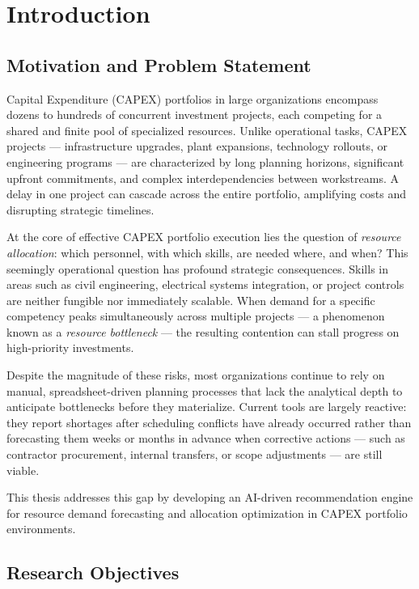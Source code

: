 \chapter{Introduction}
\label{chap:introduction}

\section{Motivation and Problem Statement}
\label{sec:motivation}

Capital Expenditure (CAPEX) portfolios in large organizations encompass dozens to hundreds of concurrent investment projects, each competing for a shared and finite pool of specialized resources. Unlike operational tasks, CAPEX projects — infrastructure upgrades, plant expansions, technology rollouts, or engineering programs — are characterized by long planning horizons, significant upfront commitments, and complex interdependencies between workstreams. A delay in one project can cascade across the entire portfolio, amplifying costs and disrupting strategic timelines.

At the core of effective CAPEX portfolio execution lies the question of \textit{resource allocation}: which personnel, with which skills, are needed where, and when? This seemingly operational question has profound strategic consequences. Skills in areas such as civil engineering, electrical systems integration, or project controls are neither fungible nor immediately scalable. When demand for a specific competency peaks simultaneously across multiple projects — a phenomenon known as a \textit{resource bottleneck} — the resulting contention can stall progress on high-priority investments.

Despite the magnitude of these risks, most organizations continue to rely on manual, spreadsheet-driven planning processes that lack the analytical depth to anticipate bottlenecks before they materialize. Current tools are largely reactive: they report shortages after scheduling conflicts have already occurred rather than forecasting them weeks or months in advance when corrective actions — such as contractor procurement, internal transfers, or scope adjustments — are still viable.

This thesis addresses this gap by developing an AI-driven recommendation engine for resource demand forecasting and allocation optimization in CAPEX portfolio environments.

\section{Research Objectives}
\label{sec:research_objectives}

